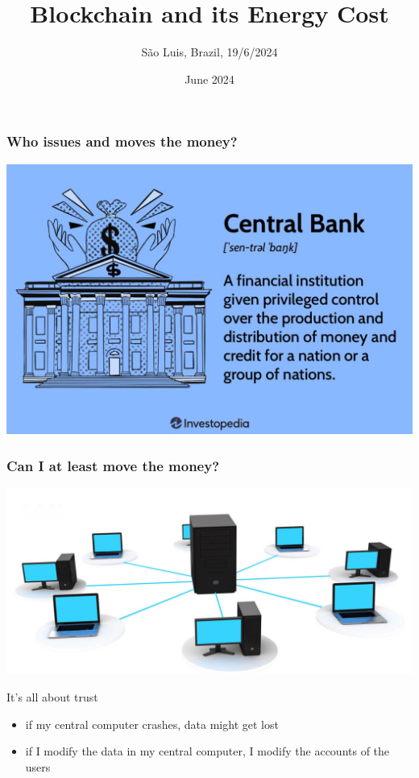 \documentclass[11pt]{beamer}  %
\subtitle{S\~ao Luis, Brazil, 19/6/2024}
\title{Blockchain and its Energy Cost}
\institute{Universit\`a di Verona, Italy}
\date{June 2024}
\begin{document}
\begin{frame}
  \titlepage
\end{frame}

\begin{frame}\frametitle{Who issues and moves the money?}

  \begin{center}
    \includegraphics[scale=0.22,clip=false]{pictures/central-bank.jpg}
  \end{center}

\end{frame}

\begin{frame}\frametitle{Can I at least move the money?}

  \begin{center}
    \includegraphics[scale=0.22,clip=false]{pictures/centralized-network.jpg}
  \end{center}

  \begin{greenbox}{It's all about trust}
    \begin{itemize}
    \item if my central computer crashes, data might get lost
    \item if I modify the data in my central computer, I modify
      the accounts of the users
    \end{itemize}
  \end{greenbox}
  
\end{frame}
\end{document}
